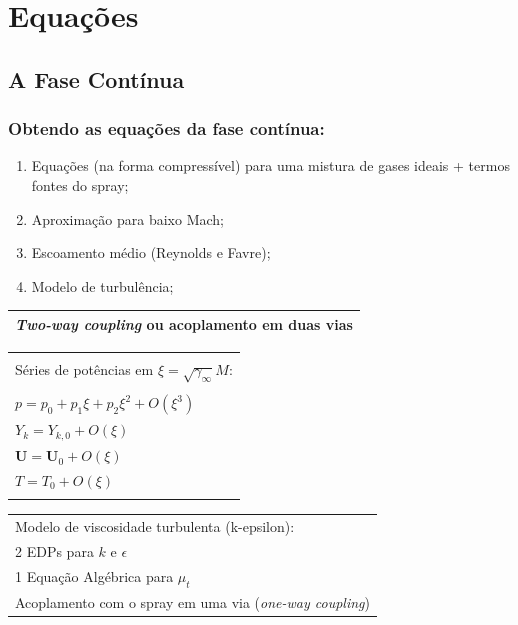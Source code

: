 \documentclass[bars,mathserif]{beamer}
\newcommand{\bv}[1]{\mathbf{#1}}
\begin{document}
%
\section{Equações}
\frame{\tableofcontents[currentsection]}
%
\subsection{A Fase Contínua}
%
\begin{frame}
\frametitle{Obtendo as equações da fase contínua:}
\begin{enumerate}
 \item<1-> Equações (na forma compressível) para uma mistura de gases ideais \pause + \alert{termos fontes do spray};
 \item<3-> Aproximação para baixo Mach;
 \item<5-> Escoamento médio (Reynolds e Favre);
 \item<7-> Modelo de turbulência;
\end{enumerate}
%
\begin{overprint}
\footnotesize
\centering
\begin{tabular}{|l|}
\hline
\textit{Two-way coupling} ou acoplamento em duas vias \\
\hline 
\end{tabular}

\footnotesize
\centering
\begin{tabular}{|l|}
\hline \\
Séries de potências em $\xi = \sqrt{\gamma_{\infty}} M$:\\ \\
$p = p_{0} + p_{1}\xi + p_{2}\xi^2 + O\left( \xi^3 \right)$\\
$Y_k = Y_{k,0} + O\left( \xi \right) $\\
$\bv{U} = \bv{U}_{0} + O\left( \xi \right)$ \\
$T = T_{0} + O\left( \xi \right)$ \\ \\
\hline 
\end{tabular}
%
\footnotesize
\centering
\vspace{10pt}
\begin{tabular}{|l|}
\hline
Modelo de viscosidade turbulenta (k-epsilon): \\
2 EDPs para $k$ e $\epsilon$ \\
1 Equação Algébrica para $\mu_t$ \\
Acoplamento com o spray em uma via (\textit{one-way coupling}) \\
\hline 
\end{tabular}
\end{overprint}
\end{frame}
\end{document}
